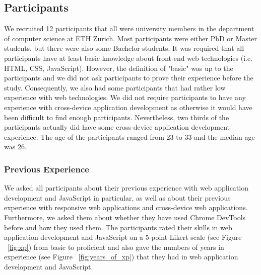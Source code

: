 \subsection{Participants}

We recruited 12 participants that all were university members in the department of computer science at ETH Zurich. Most participants were either PhD or Master students, but there were also some Bachelor students. It was required that all participants have at least basic knowledge about front-end web technologies (i.e. HTML, CSS, JavaScript). However, the definition of "basic" was up to the participants and we did not ask participants to prove their experience before the study. Consequently, we also had some participants that had rather low experience with web technologies. We did not require participants to have any experience with cross-device application development as otherwise it would have been difficult to find enough participants. Nevertheless, two thirds of the participants actually did have some cross-device application development experience. The age of the participants ranged from 23 to 33 and the median age was 26. 

\subsubsection{Previous Experience}
We asked all participants about their previous experience with web application development and JavaScript in particular, as well as about their previous experience with responsive web applications and cross-device web applications. Furthermore, we asked them about whether they have used Chrome DevTools before and how they used them. The participants rated their skills in web application development and JavaScript on a 5-point Likert scale (see Figure ~\ref{fig:xp}) from basic to proficient and also gave the numbers of years in experience (see Figure ~\ref{fig:years_of_xp}) that they had in web application development and JavaScript.

